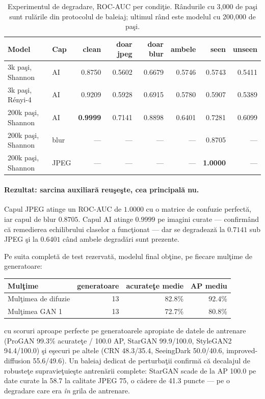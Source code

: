 \begin{table}[t]
  \centering
  \caption{Experimentul de degradare, ROC-AUC per condiţie. Rândurile cu 3{,}000
  de paşi sunt rulările din protocolul de baleiaj; ultimul rând este modelul cu
  200{,}000 de paşi.}
  \label{tab:degradation}
  \begin{tabular}{llrrrrrr}
    \toprule
    Model & Cap & clean & doar jpeg & doar blur & ambele & seen & unseen \\
    \midrule
    3k paşi, Shannon     & AI   & 0.8750 & 0.5602 & 0.6679 & 0.5746 & 0.5743 & 0.5411 \\
    3k paşi, Rényi-4     & AI   & 0.9209 & 0.5928 & 0.6915 & 0.5780 & 0.5907 & 0.5389 \\
    200k paşi, Shannon   & AI   & \textbf{0.9999} & 0.7141 & 0.8898 & 0.6401 & 0.7281 & 0.6099 \\
    200k paşi, Shannon   & blur & --- & --- & --- & --- & 0.8705 & --- \\
    200k paşi, Shannon   & JPEG & --- & --- & --- & --- & \textbf{1.0000} & --- \\
    \bottomrule
  \end{tabular}
\end{table}

\paragraph{Rezultat: sarcina auxiliară reuşeşte, cea principală nu.} Capul JPEG
atinge un ROC-AUC de $1.0000$ cu o matrice de confuzie perfectă, iar capul de
blur $0.8705$. Capul AI atinge $0.9999$ pe imagini curate --- confirmând că
remedierea echilibrului claselor a funcţionat --- dar se degradează la $0.7141$
sub JPEG şi la $0.6401$ când ambele degradări sunt prezente.

Pe suita completă de test rezervată, modelul final obţine, pe fiecare mulţime de
generatoare:

\begin{center}
\begin{tabular}{lrrr}
  \toprule
  Mulţime & generatoare & acurateţe medie & AP mediu \\
  \midrule
  Mulţimea de difuzie & 13 & 82.8\% & 92.4\% \\
  Mulţimea GAN 1      & 13 & 72.7\% & 80.8\% \\
  \bottomrule
\end{tabular}
\end{center}

cu scoruri aproape perfecte pe generatoarele apropiate de datele de antrenare
(ProGAN 99.3\% acurateţe / 100.0 AP, StarGAN 99.9/100.0, StyleGAN2 94.4/100.0) şi
eşecuri pe altele (CRN 48.3/35.4, SeeingDark 50.0/40.6, improved-diffusion
55.6/49.6). Un baleiaj dedicat de perturbaţii confirmă că decalajul de robusteţe
supravieţuieşte antrenării complete: StarGAN scade de la AP 100.0 pe date curate
la 58.7 la calitate JPEG 75, o cădere de 41.3 puncte --- pe o degradare care era
\emph{în} grila de antrenare.

